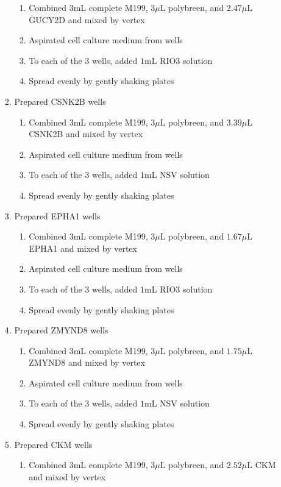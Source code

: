 \begin{enumerate}
\begin{enumerate}
\begin{enumerate}
\begin{enumerate}
							\item Combined $3$mL complete M199, $3\mu$L polybreen, and $2.47\mu$L GUCY2D and mixed by vertex
							\item Aspirated cell culture medium from wells
							\item To each of the 3 wells, added $1$mL RIO3 solution
							\item Spread evenly by gently shaking plates
						\end{enumerate}
					\item Prepared CSNK2B wells
						\begin{enumerate}
							\item Combined $3$mL complete M199, $3\mu$L polybreen, and $3.39\mu$L CSNK2B and mixed by vertex
							\item Aspirated cell culture medium from wells
							\item To each of the 3 wells, added $1$mL NSV solution
							\item Spread evenly by gently shaking plates
						\end{enumerate}
					\item Prepared EPHA1 wells
						\begin{enumerate}
							\item Combined $3$mL complete M199, $3\mu$L polybreen, and $1.67\mu$L EPHA1 and mixed by vertex
							\item Aspirated cell culture medium from wells
							\item To each of the 3 wells, added $1$mL RIO3 solution
							\item Spread evenly by gently shaking plates
						\end{enumerate}
					\item Prepared ZMYND8 wells
						\begin{enumerate}
							\item Combined $3$mL complete M199, $3\mu$L polybreen, and $1.75\mu$L ZMYND8 and mixed by vertex
							\item Aspirated cell culture medium from wells
							\item To each of the 3 wells, added $1$mL NSV solution
							\item Spread evenly by gently shaking plates
						\end{enumerate}
					\item Prepared CKM wells
						\begin{enumerate}
							\item Combined $3$mL complete M199, $3\mu$L polybreen, and $2.52\mu$L CKM and mixed by vertex

\end{enumerate}
\end{enumerate}
\end{enumerate}
\end{enumerate}
